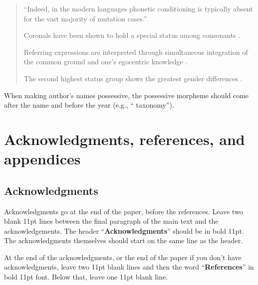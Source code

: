 \documentclass[xelatex,linguex]{TWPL}
\begin{document}
\begin{quote}
``Indeed, in the modern languages phonetic conditioning is typically absent for the vast majority of mutation cases.'' \citep[2811]{Hannahs2010} %

Coronals have been shown to hold a special status among consonants \citep{Kiparsky1985, AveryRice1989}.

Referring expressions are interpreted through simultaneous integration of the common ground and one's egocentric knowledge \citep{HellerEtal2016}.

The second highest status group shows the greatest gender differences \citep{Labov1966, Labov2001, Wolfram1971, Eckert1999}. %

\end{quote}

When making author's names possessive, the possessive morpheme should come after the name and before the year (e.g., `` taxonomy''). %

\section{Acknowledgments, references, and appendices}

\subsection{Acknowledgments}

Acknowledgments go at the end of the paper, before the references. Leave two blank 11pt lines between the final paragraph of the main text and the acknowledgements. The header ``\textbf{Acknowledgments}'' should be in bold 11pt. The acknowledgments themselves should start on the same line as the header.

At the end of the acknowledgments, or the end of the paper if you don't have acknowledgments, leave two 11pt blank lines and then the word ``\textbf{References}'' in bold 11pt font. Below that, leave one 11pt blank line.
\end{document}
